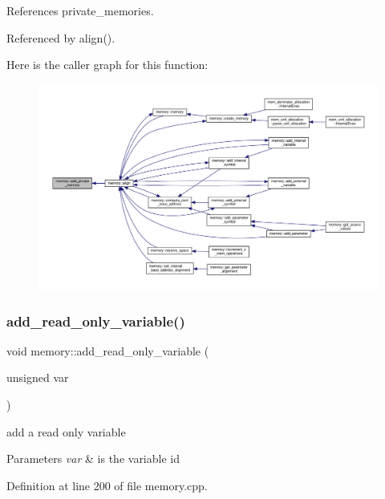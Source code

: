 References private\+\_\+memories.



Referenced by align().

Here is the caller graph for this function\+:
\nopagebreak
\begin{figure}[H]
\begin{center}
\leavevmode
\includegraphics[width=350pt]{d8/d99/classmemory_a15d9eb23dfbab98d05a5075f1230c3e0_icgraph}
\end{center}
\end{figure}
\mbox{\label{classmemory_a626219c7688337cb254b4586af7aaeac}} 
\subsubsection{\texorpdfstring{add\+\_\+read\+\_\+only\+\_\+variable()}{add\_read\_only\_variable()}}
{\footnotesize\ttfamily void memory\+::add\+\_\+read\+\_\+only\+\_\+variable (\begin{DoxyParamCaption}\item[{unsigned}]{var }\end{DoxyParamCaption})}



add a read only variable 


\begin{DoxyParams}{Parameters}
{\em var} & is the variable id \\
\hline
\end{DoxyParams}


Definition at line 200 of file memory.\+cpp.



